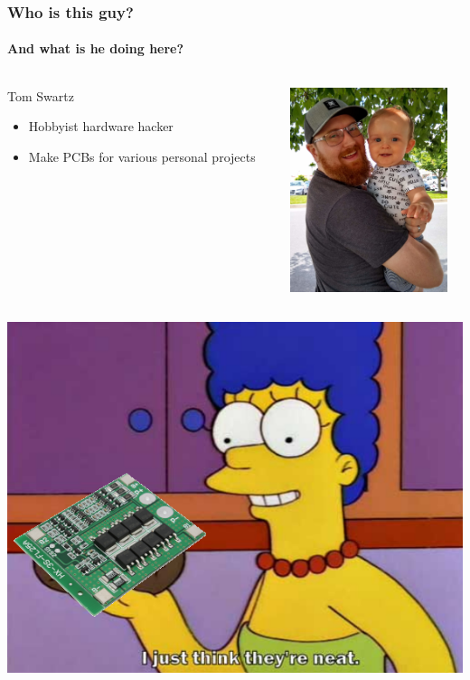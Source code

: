 \documentclass[]{beamer}
\begin{document}
\begin{frame}[plain]
    \frametitle{Who is this guy?}
    \framesubtitle{And what is he doing here?}
    \begin{columns}[T]
        \begin{column}[T]{5cm}
           {\huge Tom Swartz}
            \begin{itemize}%
                \item{Hobbyist hardware hacker}
                \item{Make PCBs for various personal projects}
            \end{itemize}
        \end{column}
        \begin{column}[T]{5cm}
            \includegraphics[height=6cm]{images/me.jpg}
        \end{column}
    \end{columns}
\end{frame}
\begin{frame}[plain]
    \includegraphics[width=0.85\paperwidth,keepaspectratio]{images/i_think_neat.png}
\end{frame}
\end{document}
